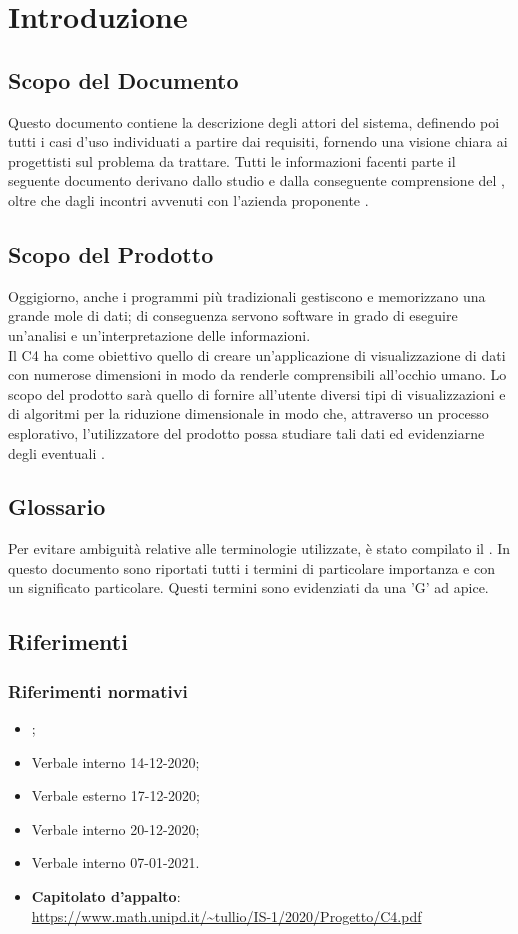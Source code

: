 \section{Introduzione}
\subsection{Scopo del Documento}
Questo documento contiene la descrizione degli attori del sistema, definendo poi tutti i casi d'uso individuati a partire dai requisiti, fornendo una visione chiara ai progettisti sul problema da trattare. Tutti le informazioni facenti parte il seguente documento derivano dallo studio e dalla conseguente comprensione del , oltre che dagli incontri avvenuti con l'azienda proponente \Proponente{}.
\subsection{Scopo del Prodotto}
Oggigiorno, anche i programmi più tradizionali gestiscono e memorizzano una grande mole di dati; di conseguenza servono software in grado di eseguire un'analisi e un'interpretazione delle informazioni.\\
Il  C4 ha come obiettivo quello di creare un'applicazione di visualizzazione di dati con numerose dimensioni in modo da renderle comprensibili all'occhio umano.  Lo scopo del prodotto sarà quello di fornire all'utente diversi tipi di visualizzazioni e di algoritmi per la riduzione dimensionale in modo che, attraverso un processo esplorativo, l'utilizzatore del prodotto possa studiare tali dati ed evidenziarne degli eventuali . 
\subsection{Glossario}
Per evitare ambiguità relative alle terminologie utilizzate, è stato compilato il . In questo documento sono riportati tutti i termini di particolare importanza e con un significato particolare. Questi termini sono evidenziati da una 'G' ad apice.
\subsection{Riferimenti}
\subsubsection{Riferimenti normativi}
\begin{itemize}
	\item {};
	\item Verbale interno 14-12-2020;
	\item Verbale esterno 17-12-2020;
	\item Verbale interno 20-12-2020;
	\item Verbale interno 07-01-2021.
	\item \textbf{Capitolato d'appalto}:\\
	\textcolor{blue}{\url{https://www.math.unipd.it/~tullio/IS-1/2020/Progetto/C4.pdf}}
\end{itemize}

